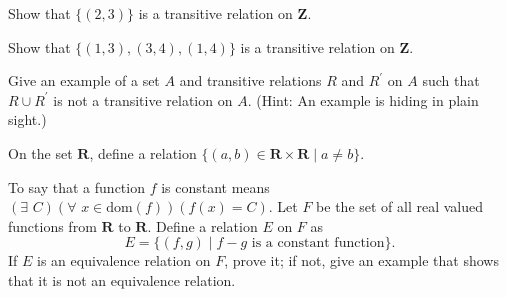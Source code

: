 \documentclass[12pt,fleqn,answers]{exam}
\newcommand{\reals}{\mathbf{R}}
\newcommand{\dom}{\mbox{dom}}
\newcommand{\integers}{\mathbf{Z}}
\begin{document}
\begin{questions} 

\question [1] Show that $\{(2,3)\}$ is a transitive relation on $\integers$.


\question [1] Show that $\{(1,3), (3,4), (1,4)\}$ is a transitive relation on $\integers$.

\question [1] Give an example of a set $A$ and transitive relations
$R$ and $R^\prime$ on $A$ such that $R \cup R^\prime$ is not 
a transitive relation on $A$. (Hint: An example is hiding in plain sight.)

\question On the set $\reals$, define a relation $\{(a,b) \in \reals \times \reals \mid a \neq b \}$.


\question [1] To say that a function $f$ is constant means
\(
     \left(\exists \,\,  C  \right)
     \left(\forall \,\, x \in \dom(f) \right)
     \left(f(x) = C \right)
\). Let $F$ be the set of all real valued functions from $\reals$ to 
$\reals$. Define a relation $E$ on $F$ as 
\begin{equation*}
    E = \{(f,g) \mid f - g \mbox{ is a constant function} \}.
\end{equation*}
If $E$ is an equivalence relation on $F$, prove it; if not, 
give an example that shows that it is not an equivalence relation.



\end{questions}
\end{document}
